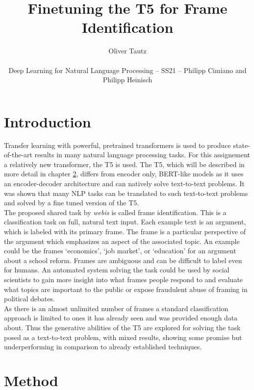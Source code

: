 \documentclass[11pt,a4paper,onecolumn,oneside,notitlepage]{article}
\author{Oliver Tautz\\
	\begin{small}
		Deep Learning for Natural Language Processing -- SS21 -- Philipp Cimiano and Philipp Heinisch
	\end{small}
}
\title{Finetuning the T5 for Frame Identification}
\begin{document}
	\maketitle
	
	\section{Introduction}
Transfer learning with powerful, pretrained transformers is used to produce state-of-the-art results in many natural language processing tasks. \citep{wolf-etal-2020-transformers} For this assignement a relatively new transformer, the T5 \citep{T5} is used. The T5, which will be described in more detail in chapter \ref{method}, differs from encoder only, BERT-like \citep{bert} models as it uses an encoder-decoder architecture and can natively solve text-to-text problems. It was shown that many NLP tasks can be translated to such text-to-text problems and solved by a fine tuned version of the T5.\citep{T5}\\


The proposed shared task by \textit{webis} \citep{webis_task} is called frame identification. This is a classification task on full, natural text input. Each example text is an argument, which is labeled with its primary frame. The frame is a particular perspective of the argument which emphasizes an aspect of the associated topic. An example could be the frames ‘economics’, ‘job market’, or ‘education’ for an argument about a school reform. Frames are ambiguous and can be difficult to label even for humans. An automated system solving the task could be used by social scientists to gain more insight into what frames people respond to and evaluate what topics are important to the public or expose fraudulent abuse of framing in political debates.\\

As there is an almost unlimited number of frames a standard classification approach is limited to ones it has already seen and was provided enough data about. Thus the generative abilities of the T5 are explored for solving the task posed as a text-to-text problem, with mixed results, showing some promise but underperforming in comparison to already established techniques. 

		

\section{Method}
\label{method}
\end{document}
